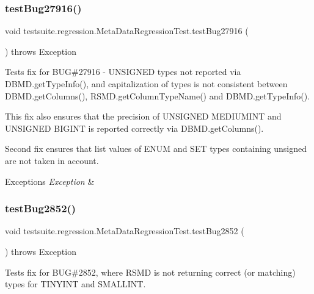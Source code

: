 \subsubsection{\texorpdfstring{test\+Bug27916()}{testBug27916()}}
{\footnotesize\ttfamily void testsuite.\+regression.\+Meta\+Data\+Regression\+Test.\+test\+Bug27916 (\begin{DoxyParamCaption}{ }\end{DoxyParamCaption}) throws Exception}

Tests fix for B\+UG\#27916 -\/ U\+N\+S\+I\+G\+N\+ED types not reported via D\+B\+M\+D.\+get\+Type\+Info(), and capitalization of types is not consistent between D\+B\+M\+D.\+get\+Columns(), R\+S\+M\+D.\+get\+Column\+Type\+Name() and D\+B\+M\+D.\+get\+Type\+Info().

This fix also ensures that the precision of U\+N\+S\+I\+G\+N\+ED M\+E\+D\+I\+U\+M\+I\+NT and U\+N\+S\+I\+G\+N\+ED B\+I\+G\+I\+NT is reported correctly via D\+B\+M\+D.\+get\+Columns().

Second fix ensures that list values of E\+N\+UM and S\+ET types containing \textquotesingle{}unsigned\textquotesingle{} are not taken in account.


\begin{DoxyExceptions}{Exceptions}
{\em Exception} & \\
\hline
\end{DoxyExceptions}
\mbox{\label{classtestsuite_1_1regression_1_1_meta_data_regression_test_a37ae44d17afdb072e212dace2d333db9}} 
\subsubsection{\texorpdfstring{test\+Bug2852()}{testBug2852()}}
{\footnotesize\ttfamily void testsuite.\+regression.\+Meta\+Data\+Regression\+Test.\+test\+Bug2852 (\begin{DoxyParamCaption}{ }\end{DoxyParamCaption}) throws Exception}

Tests fix for B\+UG\#2852, where R\+S\+MD is not returning correct (or matching) types for T\+I\+N\+Y\+I\+NT and S\+M\+A\+L\+L\+I\+NT.


